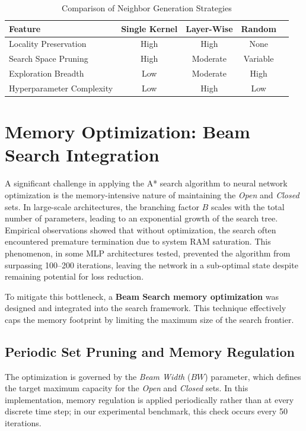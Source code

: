 \begin{table}[H]
\centering
\caption{Comparison of Neighbor Generation Strategies}
\label{tab:strategy_comparison}
\begin{tabular}{lcccc}
\hline
\textbf{Feature} & \textbf{Single Kernel} & \textbf{Layer-Wise} & \textbf{Random} \\ \hline
Locality Preservation & High & High & None \\
Search Space Pruning & High & Moderate & Variable \\
Exploration Breadth & Low & Moderate & High \\
Hyperparameter Complexity & Low & High & Low \\ \hline
\end{tabular}
\end{table}


\section{Memory Optimization: Beam Search Integration}

A significant challenge in applying the A* search algorithm to neural network optimization is the memory-intensive nature of maintaining the \textit{Open} and \textit{Closed} sets. In large-scale architectures, the branching factor $B$ scales with the total number of parameters, leading to an exponential growth of the search tree. Empirical observations showed that without optimization, the search often encountered premature termination due to system RAM saturation. This phenomenon, in some MLP architectures tested, prevented the algorithm from surpassing 100--200 iterations, leaving the network in a sub-optimal state despite remaining potential for loss reduction.

To mitigate this bottleneck, a \textbf{Beam Search memory optimization} was designed and integrated into the search framework. This technique effectively caps the memory footprint by limiting the maximum size of the search frontier.

\subsection{Periodic Set Pruning and Memory Regulation}
The optimization is governed by the \textit{Beam Width} ($BW$) parameter, which defines the target maximum capacity for the \textit{Open} and \textit{Closed} sets. In this implementation, memory regulation is applied periodically rather than at every discrete time step; in our experimental benchmark, this check occurs every 50 iterations.


